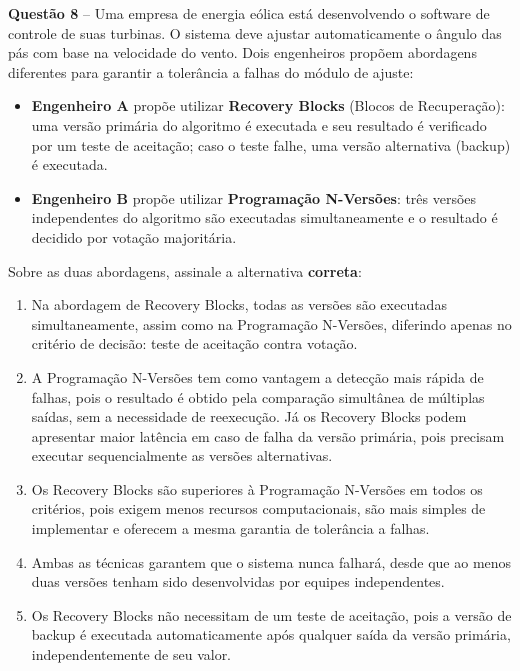 \documentclass[12pt,a4paper]{article}
\begin{document}
\vspace{0.5cm}

\textbf{Questão 8} -- Uma empresa de energia eólica está desenvolvendo o software de controle de suas turbinas. O sistema deve ajustar automaticamente o ângulo das pás com base na velocidade do vento. Dois engenheiros propõem abordagens diferentes para garantir a tolerância a falhas do módulo de ajuste:

\begin{itemize}
    \item \textbf{Engenheiro A} propõe utilizar \textbf{Recovery Blocks} (Blocos de Recuperação): uma versão primária do algoritmo é executada e seu resultado é verificado por um teste de aceitação; caso o teste falhe, uma versão alternativa (backup) é executada.
    \item \textbf{Engenheiro B} propõe utilizar \textbf{Programação N-Versões}: três versões independentes do algoritmo são executadas simultaneamente e o resultado é decidido por votação majoritária.
\end{itemize}

\vspace{0.2cm}

Sobre as duas abordagens, assinale a alternativa \textbf{correta}:

\vspace{0.3cm}

\begin{enumerate}[label=\textbf{(\Alph*)}]
    \item Na abordagem de Recovery Blocks, todas as versões são executadas simultaneamente, assim como na Programação N-Versões, diferindo apenas no critério de decisão: teste de aceitação contra votação.

    \item A Programação N-Versões tem como vantagem a detecção mais rápida de falhas, pois o resultado é obtido pela comparação simultânea de múltiplas saídas, sem a necessidade de reexecução. Já os Recovery Blocks podem apresentar maior latência em caso de falha da versão primária, pois precisam executar sequencialmente as versões alternativas.

    \item Os Recovery Blocks são superiores à Programação N-Versões em todos os critérios, pois exigem menos recursos computacionais, são mais simples de implementar e oferecem a mesma garantia de tolerância a falhas.

    \item Ambas as técnicas garantem que o sistema nunca falhará, desde que ao menos duas versões tenham sido desenvolvidas por equipes independentes.

    \item Os Recovery Blocks não necessitam de um teste de aceitação, pois a versão de backup é executada automaticamente após qualquer saída da versão primária, independentemente de seu valor.
\end{enumerate}
\end{document}
